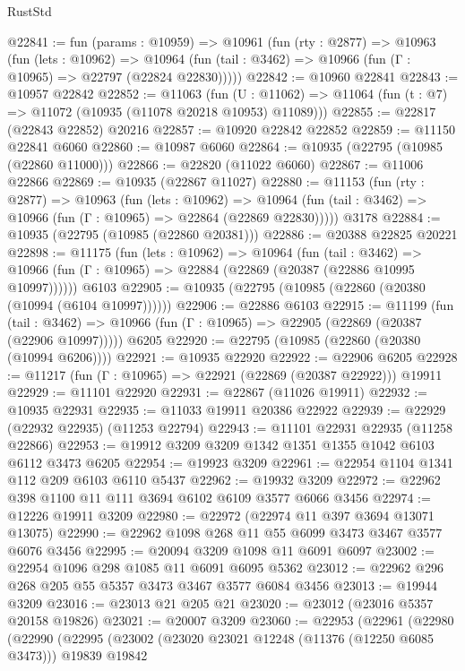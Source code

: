 \begin{lexlean}{RustStd}
\begin{coremodule}
{{{{{{{{{{{{{{{{{{{@22841 := fun (params : @10959) =>
  @10961
    (fun (rty : @2877) =>
    @10963
      (fun (lets : @10962) =>
      @10964 (fun (tail : @3462) => @10966 (fun (Γ : @10965) => @22797 (@22824 @22830)))))
@22842 := @10960 @22841
@22843 := @10957 @22842
@22852 := @11063
    (fun (U : @11062) => @11064 (fun (t : @7) => @11072 (@10935 (@11078 @20218 @10953) @11089)))
@22855 := @22817 (@22843 @22852) @20216
@22857 := @10920 @22842 @22852
@22859 := @11150 @22841 @6060
@22860 := @10987 @6060
@22864 := @10935 (@22795 (@10985 (@22860 @11000)))
@22866 := @22820 (@11022 @6060)
@22867 := @11006 @22866
@22869 := @10935 (@22867 @11027)
@22880 := @11153
    (fun (rty : @2877) =>
    @10963
      (fun (lets : @10962) =>
      @10964 (fun (tail : @3462) => @10966 (fun (Γ : @10965) => @22864 (@22869 @22830)))))
    @3178
@22884 := @10935 (@22795 (@10985 (@22860 @20381)))
@22886 := @20388 @22825 @20221
@22898 := @11175
    (fun (lets : @10962) =>
    @10964
      (fun (tail : @3462) =>
      @10966 (fun (Γ : @10965) => @22884 (@22869 (@20387 (@22886 @10995 @10997))))))
    @6103
@22905 := @10935 (@22795 (@10985 (@22860 (@20380 (@10994 (@6104 @10997))))))
@22906 := @22886 @6103
@22915 := @11199
    (fun (tail : @3462) => @10966 (fun (Γ : @10965) => @22905 (@22869 (@20387 (@22906 @10997)))))
    @6205
@22920 := @22795 (@10985 (@22860 (@20380 (@10994 @6206))))
@22921 := @10935 @22920
@22922 := @22906 @6205
@22928 := @11217 (fun (Γ : @10965) => @22921 (@22869 (@20387 @22922))) @19911
@22929 := @11101 @22920
@22931 := @22867 (@11026 @19911)
@22932 := @10935 @22931
@22935 := @11033 @19911 @20386 @22922
@22939 := @22929 (@22932 @22935) (@11253 @22794)
@22943 := @11101 @22931 @22935 (@11258 @22866)
@22953 := @19912 @3209 @3209 @1342 @1351 @1355 @1042 @6103 @6112 @3473 @6205
@22954 := @19923 @3209
@22961 := @22954 @1104 @1341 @112 @209 @6103 @6110 @5437
@22962 := @19932 @3209
@22972 := @22962 @398 @1100 @11 @111 @3694 @6102 @6109 @3577 @6066 @3456
@22974 := @12226 @19911 @3209
@22980 := @22972 (@22974 @11 @397 @3694 @13071 @13075)
@22990 := @22962 @1098 @268 @11 @55 @6099 @3473 @3467 @3577 @6076 @3456
@22995 := @20094 @3209 @1098 @11 @6091 @6097
@23002 := @22954 @1096 @298 @1085 @11 @6091 @6095 @5362
@23012 := @22962 @296 @268 @205 @55 @5357 @3473 @3467 @3577 @6084 @3456
@23013 := @19944 @3209
@23016 := @23013 @21 @205 @21
@23020 := @23012 (@23016 @5357 @20158 @19826)
@23021 := @20007 @3209
@23060 := @22953
    (@22961
      (@22980
        (@22990
          (@22995
            (@23002
              (@23020 @23021 @12248 (@11376 (@12250 @6085 @3473)))
              @19839
              @19842
}}}}}}}}}}}}}}}}}}}
\end{coremodule}
\end{lexlean}
